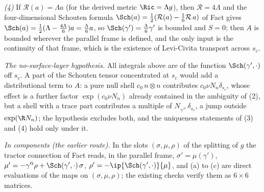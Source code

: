 \emph{(4)} If $\mathcal{R}(a) = \Lambda a$ (for the derived metric $\Ric = \Lambda g$), then $\mathcal{R} = 4\Lambda$ and the four-dimensional Schouten formula $\Sch(a) = \tfrac12(\mathcal{R}(a) - \tfrac16\mathcal{R}\,a)$ of Fact  gives $\Sch(a) = \tfrac12(\Lambda - \tfrac{4\Lambda}{6})a = \tfrac{\Lambda}{6}a$, so $\Sch(\gamma') = \tfrac{\Lambda}{6}\gamma'$ is bounded and $S = 0$; then $A$ is bounded wherever the parallel frame is defined, and the only input is the continuity of that frame, which is the existence of Levi-Civita transport across $s_c$.

\emph{The no-surface-layer hypothesis.} All integrals above are of the function $\Sch(\gamma',\cdot)$ off $s_c$. A part of the Schouten tensor concentrated at $s_c$ would add a distributional term to $A$: a pure null shell $c_0\, n \otimes n$ contributes $c_0 \nu N_n \delta_{s_c}$, whose effect is a further factor $\exp(c_0\nu N_n)$ already contained in the ambiguity of (2), but a shell with a trace part contributes a multiple of $N_{\gamma'^{\flat}}\,\delta_{s_c}$, a jump outside $\exp(\R N_n)$; the hypothesis excludes both, and the uniqueness statements of (3) and (4) hold only under it.

\emph{In components (the earlier route).} In the slots $(\sigma, \mu, \rho)$ of the splitting of $g$ the tractor connection of Fact  reads, in the parallel frame, $\sigma' = \mu(\gamma')$, $\mu' = -\gamma'^{\flat}\rho + \Sch(\gamma', \cdot)\,\sigma$, $\rho' = -\ip{\Sch(\gamma', \cdot)}{\mu}$, and (a) to (c) are direct evaluations of the maps on $(\sigma, \mu, \rho)$; the existing checks verify them as $6\times 6$ matrices.
